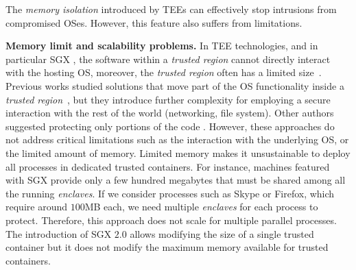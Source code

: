 The \emph{memory isolation} introduced by TEEs can effectively stop 
intrusions from compromised OSes.
However, this feature also suffers from limitations.

\vspace{0.5cm}
\noindent \textbf{Memory limit and scalability problems.}
In TEE technologies, and in particular SGX \citep{costan2016intel}, the 
software within a \emph{trusted region} cannot directly interact with the 
hosting OS, moreover, the \emph{trusted region} often has a limited 
size~\citep{baumann2015shielding}.
Previous works studied solutions that move part of the OS functionality inside 
a \emph{trusted 
region}~\citep{baumann2015shielding,arnautov2016scone,tsai2017graphene},
but they introduce further complexity for employing a secure interaction with 
the rest of the world (\eg networking, file system).
Other authors suggested protecting only portions of the 
code \citep{schuster2015vc3,lind2017glamdring}.
However, these approaches do not address critical limitations such as the 
interaction with the underlying OS, or the limited amount of memory.
Limited memory makes it unsustainable to deploy all processes in dedicated 
trusted containers.
For instance, machines featured with SGX provide only a few hundred megabytes 
that must be shared among all the running \emph{enclaves}.
If we consider processes such as Skype or Firefox, which require around 
$100$MB each, we need multiple \emph{enclaves} for each process to protect.
Therefore, this approach does not scale for multiple parallel processes.
The introduction of SGX $2.0$ allows modifying the size of a single trusted 
container but it does not modify the maximum memory available for trusted 
containers.

